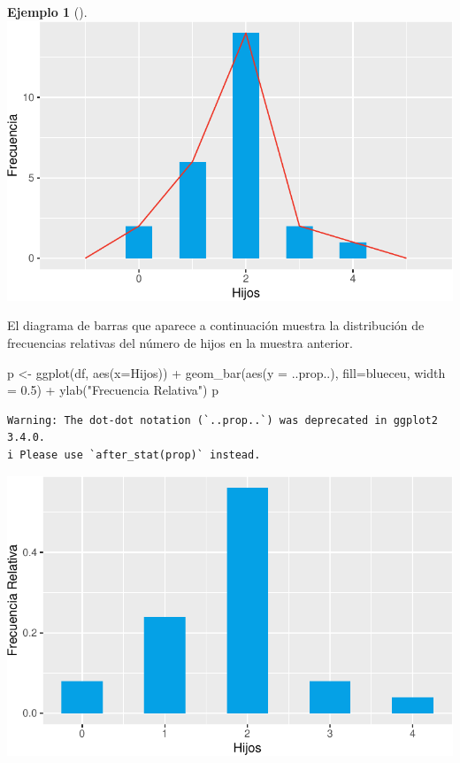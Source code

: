 \documentclass[
  a4paper,
]{scrreport}
\newenvironment{Shaded}{\begin{snugshade}}{\end{snugshade}}
\newcommand{\AttributeTok}[1]{\textcolor[rgb]{0.40,0.45,0.13}{#1}}
\newcommand{\FloatTok}[1]{\textcolor[rgb]{0.68,0.00,0.00}{#1}}
\newcommand{\FunctionTok}[1]{\textcolor[rgb]{0.28,0.35,0.67}{#1}}
\newcommand{\NormalTok}[1]{\textcolor[rgb]{0.00,0.23,0.31}{#1}}
\newcommand{\OtherTok}[1]{\textcolor[rgb]{0.00,0.23,0.31}{#1}}
\newcommand{\SpecialCharTok}[1]{\textcolor[rgb]{0.37,0.37,0.37}{#1}}
\newcommand{\StringTok}[1]{\textcolor[rgb]{0.13,0.47,0.30}{#1}}
\theoremstyle{plain}
\theoremstyle{definition}
\theoremstyle{definition}
\newtheorem{example}{Ejemplo}[chapter]
\theoremstyle{remark}
\begin{document}
\begin{example}[]
\includegraphics{02-estadistica-descriptiva_files/figure-pdf/poligono-frecuencias-absolutas-1.pdf}

El diagrama de barras que aparece a continuación muestra la distribución
de frecuencias relativas del número de hijos en la muestra anterior.

\begin{Shaded}
\begin{Highlighting}[]
\NormalTok{p }\OtherTok{\textless{}{-}} \FunctionTok{ggplot}\NormalTok{(df, }\FunctionTok{aes}\NormalTok{(}\AttributeTok{x=}\NormalTok{Hijos)) }\SpecialCharTok{+} 
    \FunctionTok{geom\_bar}\NormalTok{(}\FunctionTok{aes}\NormalTok{(}\AttributeTok{y =}\NormalTok{ ..prop..), }\AttributeTok{fill=}\NormalTok{blueceu, }\AttributeTok{width =} \FloatTok{0.5}\NormalTok{) }\SpecialCharTok{+}
    \FunctionTok{ylab}\NormalTok{(}\StringTok{"Frecuencia Relativa"}\NormalTok{)}
\NormalTok{p}
\end{Highlighting}
\end{Shaded}

\begin{verbatim}
Warning: The dot-dot notation (`..prop..`) was deprecated in ggplot2 3.4.0.
i Please use `after_stat(prop)` instead.
\end{verbatim}

\includegraphics{02-estadistica-descriptiva_files/figure-pdf/diagrama-barras-relativas-1.pdf}


\end{example}
\end{document}
